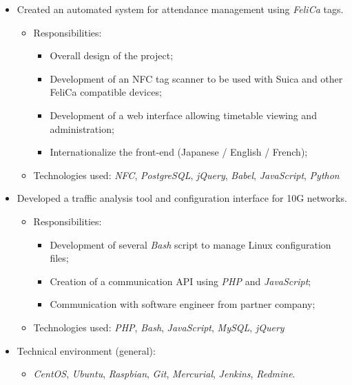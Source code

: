 \documentclass[11pt,a4paper,sans]{moderncv}
\newcommand{\techno}{\emph}
\newcommand{\lang}{\emph}
\begin{document}
{\begin{itemize}
\begin{itemize}
\begin{itemize}
            \end{itemize}
        \item Technologies used: \lang{C++}
    \end{itemize}
\item Created an automated system for attendance management using \techno{FeliCa} tags.
    \begin{itemize}%
        \item Responsibilities:
            \begin{itemize}%
                \item Overall design of the project;
                \item Development of an NFC tag scanner to be used with Suica and other FeliCa compatible devices;
                \item Development of a web interface allowing timetable viewing and administration;
                \item Internationalize the front-end (Japanese / English / French);
            \end{itemize}
        \item Technologies used: \techno{NFC}, \techno{PostgreSQL}, \techno{jQuery}, \techno{Babel}, \lang{JavaScript}, \lang{Python}
    \end{itemize}
\ifdefined\detailed%
\item Developed a traffic analysis tool and configuration interface for 10G networks.
    \begin{itemize}%
        \item Responsibilities:
            \begin{itemize}%
                \item Development of several \lang{Bash} script to manage Linux configuration files;
                \item Creation of a communication API using \lang{PHP} and \lang{JavaScript};
                \item Communication with software engineer from partner company;
            \end{itemize}
        \item Technologies used: \lang{PHP}, \lang{Bash}, \lang{JavaScript}, \techno{MySQL}, \techno{jQuery}
    \end{itemize}
\fi
\item Technical environment (general):
    \begin{itemize}%
        \item \techno{CentOS}, \techno{Ubuntu}, \techno{Raspbian}, \techno{Git}, \techno{Mercurial}, \techno{Jenkins}, \techno{Redmine}.
    \end{itemize}
\end{itemize}
}
\end{document}
